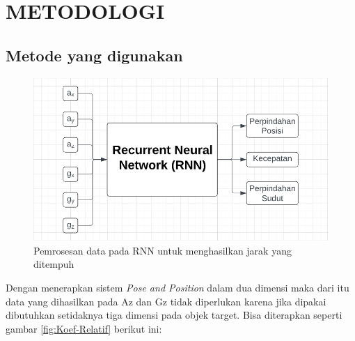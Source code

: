 \chapter{METODOLOGI}


\section{Metode yang digunakan}

\begin{figure} [ht] \centering
  \includegraphics[scale=0.35]{gambar/RNN-3Dimensi.png}
  \caption{Pemrosesan data pada RNN untuk menghasilkan jarak yang ditempuh}
  \label{fig:RNN-3D}
\end{figure}

Dengan menerapkan sistem \emph{Pose and Position} dalam dua dimensi maka dari itu data yang dihasilkan pada Az dan Gz 
tidak diperlukan karena jika dipakai dibutuhkan setidaknya tiga dimensi pada objek target. Bisa diterapkan seperti 
gambar \ref{fig:Koef-Relatif} berikut ini:

